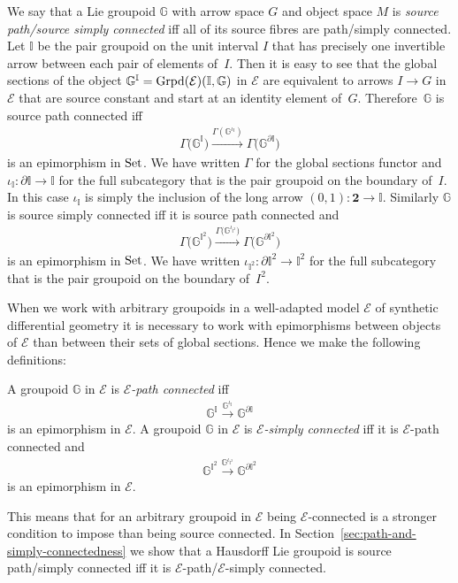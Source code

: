 \documentclass[pdftex]{sigma}
\numberwithin{equation}{section}
\begin{document}
We say that a Lie groupoid $\mathbb{G}$ with arrow space $G$ and object space $M$ is \emph{source path/source simply connected} if\/f all of its source f\/ibres are path/simply connected. Let $\mathbb{I}$ be the pair groupoid on the unit interval $I$ that has precisely one invertible arrow between each pair of elements of~$I$. Then it is easy to see that the global sections of the object $\mathbb{G}^{\mathbb{I}}= {\rm Grpd} (\mathcal{E})(\mathbb{I},\mathbb{G})$ in $\mathcal{E}$ are equivalent to arrows $I \rightarrow G$ in $\mathcal{E}$ that are source constant and start at an identity element of~$G$. Therefore~$\mathbb{G}$ is source path connected if\/f
\begin{gather*}\Gamma\big(\mathbb{G}^{\mathbb{I}}\big) \xrightarrow{\Gamma(\mathbb{G}^{\iota_{\mathbb{I}}})} \Gamma\big(\mathbb{G}^{\partial \mathbb{I}}\big)\end{gather*}
is an epimorphism in ${\rm Set}$. We have written $\Gamma$ for the global sections functor and $\iota_{\mathbb{I}}\colon \partial \mathbb{I} \rightarrow \mathbb{I}$ for the full subcategory that is the pair groupoid on the boundary of~$I$. In this case $\iota_{\mathbb{I}}$ is simply the inclusion of the long arrow $(0,1)\colon \mathbf 2 \rightarrow \mathbb{I}$. Similarly $\mathbb{G}$ is source simply connected if\/f it is source path connected and \begin{gather*}\Gamma\big(\mathbb{G}^{\mathbb{I}^2}\big) \xrightarrow{\Gamma\big(\mathbb{G}^{\iota_{\mathbb{I}^2}}\big)} \Gamma\big(\mathbb{G}^{\partial \mathbb{I}^2}\big)\end{gather*}
is an epimorphism in ${\rm Set}$. We have written $\iota_{\mathbb{I}^2}\colon \partial \mathbb{I}^2 \rightarrow \mathbb{I}^2$ for the full subcategory that is the pair groupoid on the boundary of~$I^2$.

When we work with arbitrary groupoids in a well-adapted model $\mathcal{E}$ of synthetic dif\/ferential geometry it is necessary to work with epimorphisms between objects of $\mathcal{E}$ than between their sets of global sections. Hence we make the following def\/initions:
\begin{Definition} A groupoid $\mathbb{G}$ in $\mathcal{E}$ is \emph{$\mathcal{E}$-path connected} if\/f
 \begin{gather*}\mathbb{G}^{\mathbb{I}} \xrightarrow{\mathbb{G}^{\iota_{\mathbb{I}}}} \mathbb{G}^{\partial \mathbb{I}}\end{gather*}
is an epimorphism in $\mathcal{E}$. A groupoid $\mathbb{G}$ in $\mathcal{E}$ is \emph{$\mathcal{E}$-simply connected} if\/f it is $\mathcal{E}$-path connected and
 \begin{gather*}\mathbb{G}^{\mathbb{I}^2} \xrightarrow{\mathbb{G}^{\iota_{\mathbb{I}^2}}} \mathbb{G}^{\partial \mathbb{I}^2}\end{gather*}
is an epimorphism in $\mathcal{E}$.
\end{Definition}
This means that for an arbitrary groupoid in $\mathcal{E}$ being $\mathcal{E}$-connected is a stronger condition to impose than being source connected. In Section~\ref{sec:path-and-simply-connectedness} we show that a Hausdorf\/f Lie groupoid is source path/simply connected if\/f it is $\mathcal{E}$-path/$\mathcal{E}$-simply connected.
\end{document}
